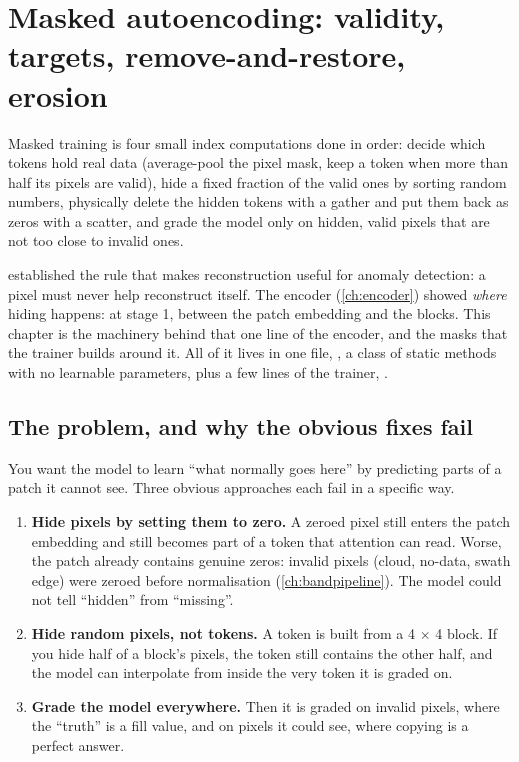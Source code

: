 \chapter{Masked autoencoding: validity, targets, remove-and-restore, erosion}\label{ch:masking}

\begin{onething}
Masked training is four small index computations done in order: decide which tokens hold real data
(average-pool the pixel mask, keep a token when more than half its pixels are valid), hide a fixed
fraction of the valid ones by sorting random numbers, physically delete the hidden tokens with a
gather and put them back as zeros with a scatter, and grade the model only on hidden, valid pixels
that are not too close to invalid ones.
\end{onething}

 established the rule that makes reconstruction useful for anomaly detection: a pixel
must never help reconstruct itself. The encoder (\cref{ch:encoder}) showed \emph{where} hiding happens:
at stage 1, between the patch embedding and the blocks. This chapter is the machinery behind that one
line of the encoder, and the masks that the trainer builds around it. All of it lives in one file,
, a class of static methods with no learnable
parameters, plus a few lines of the trainer,
.

\section{The problem, and why the obvious fixes fail}\label{sec:masking:why}

You want the model to learn ``what normally goes here'' by predicting parts of a patch it cannot see.
Three obvious approaches each fail in a specific way.

\begin{enumerate}
\item \textbf{Hide pixels by setting them to zero.} A zeroed pixel still enters the patch embedding and
still becomes part of a token that attention can read. Worse, the patch already contains genuine
zeros: invalid pixels (cloud, no-data, swath edge) were zeroed before normalisation
(\cref{ch:bandpipeline}). The model could not tell ``hidden'' from ``missing''.
\item \textbf{Hide random pixels, not tokens.} A token is built from a 4 $\times$ 4 block. If you hide
half of a block's pixels, the token still contains the other half, and the model can interpolate from
inside the very token it is graded on.
\item \textbf{Grade the model everywhere.} Then it is graded on invalid pixels, where the ``truth'' is
a fill value, and on pixels it could see, where copying is a perfect answer.
\end{enumerate}

